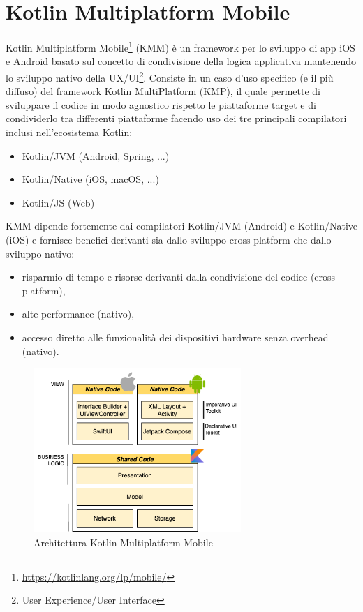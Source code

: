 

\section{Kotlin Multiplatform Mobile}
Kotlin Multiplatform Mobile\footnote{\url{https://kotlinlang.org/lp/mobile/}} (KMM) è un framework per lo sviluppo di app iOS e Android basato sul concetto di condivisione della logica applicativa mantenendo lo sviluppo nativo della UX/UI\footnote{User Experience/User Interface}. Consiste in un caso d'uso specifico (e il più diffuso) del framework Kotlin MultiPlatform (KMP), il quale permette di sviluppare il codice in modo agnostico rispetto le piattaforme target e di condividerlo tra differenti piattaforme facendo uso dei tre principali compilatori inclusi nell'ecosistema Kotlin\cite{nagy2022simplifying}:
\begin{itemize}
    \item Kotlin/JVM (Android, Spring, ...)
    \item Kotlin/Native (iOS, macOS, ...)
    \item Kotlin/JS (Web)
\end{itemize}
KMM dipende fortemente dai compilatori Kotlin/JVM (Android) e Kotlin/Native (iOS) e fornisce benefici derivanti sia dallo sviluppo cross-platform che dallo sviluppo nativo:
\begin{itemize}
    \item risparmio di tempo e risorse derivanti dalla condivisione del codice (cross-platform),
    \item alte performance (nativo),
    \item accesso diretto alle funzionalità dei dispositivi hardware senza overhead (nativo).
\end{itemize}

\begin{figure}[H]
\centering
\includegraphics[width=0.7\textwidth]{img/tesi-8-kmm.drawio.png}
\caption{Architettura Kotlin Multiplatform Mobile}
\end{figure}


